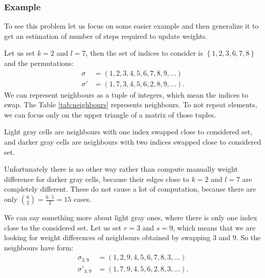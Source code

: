 	\subsubsection{Example}
		To see this problem let us focus on some easier example and then generalize it to get an estimation of number of steps required to update weights.
		
		Let us set $k=2$ and $l=7$, then the set of indices to consider is $\left\{ 1,2,3,6,7,8 \right\}$ and the permutations:
		\begin{align*}
			\sigma &= (1, 2, 3, 4, 5, 6, 7, 8, 9, \ldots) \\
			\sigma' &= (1, 7, 3, 4, 5, 6, 2, 8, 9, \ldots).
		\end{align*}
		We can represent neighbours as a tuple of integers, which mean the indices to swap. The Table \ref{tab:neighbours} represents neighbours. To not repeat elements, we can focus only on the upper triangle of a matrix of those tuples.
		
		
		
		Light gray cells are neighbours with one index swapped close to considered set, and darker gray cells are neighbours with two indices swapped close to considered set. 
		
		Unfortunately there is no other way rather than compute manually weight difference for darker gray cells, because their edges close to $k=2$ and $l=7$ are completely different. These do not cause a lot of computation, because there are only $\binom{6}{2} = \frac{6 \cdot 5}{2}=15$ cases.
		
		We can say something more about light gray ones, where there is only one index close to the considered set. Let us set $r=3$ and $s=9$, which means that we are looking for weight differences of neighbours obtained by swapping $3$ and $9$. So the neighbours have form:
		\begin{align*}
			\sigma_{3,9} &= (1, 2, 9, 4, 5, 6, 7, 8, 3, \ldots) \\
			\sigma'_{3,9} &= (1, 7, 9, 4, 5, 6, 2, 8, 3, \ldots).
		\end{align*}
		
